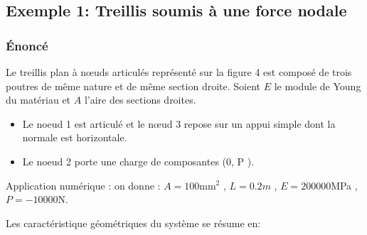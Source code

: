 \documentclass[a4paper]{article}
\begin{document}
\subsection{Exemple 1: Treillis soumis à une force nodale}
\subsubsection{Énoncé }
Le treillis plan à nœuds  articulés représenté sur la figure 4 est composé de trois poutres de même nature et de même section droite.
Soient $E$ le module de Young du matériau et $A$ l'aire des sections droites.
\begin{itemize}
\item Le noeud 1 est articulé et le nœud 3 repose sur un appui simple dont la normale est horizontale.
\item Le noeud 2 porte une charge de composantes (0, P ).
\end{itemize}
 Application numérique : on donne :
$A=100\mbox{mm}^2$ , $L=0.2 m$ , $E=200000$MPa , $P =-10000$N.
\begin{center}

\end{center}

Les caractéristique géométriques du système se résume en:\\
\end{document}

